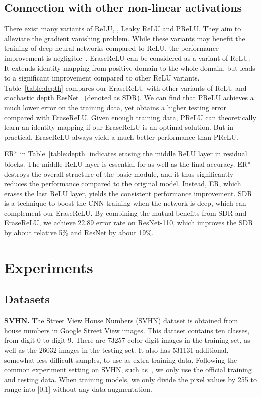 \documentclass[10pt,twocolumn,letterpaper]{article}
\begin{document}
\subsection{Connection with other non-linear activations}\label{sec:connection}
There exist many variants of ReLU, \eg, Leaky ReLU and PReLU. They aim to alleviate the gradient vanishing problem. 
While these variants may benefit the training of deep neural networks compared to ReLU, the performance improvement is negligible~\cite{xu2015empirical}.
EraseReLU can be considered as a variant of ReLU. It extends identity mapping from positive domain to the whole domain, but leads to a significant improvement compared to other ReLU variants.
Table~\ref{table:depth} compares our EraseReLU with other variants of ReLU and stochastic depth ResNet~\cite{huang2016deep} (denoted as SDR).
We can find that PReLU achieves a much lower error on the training data, yet obtains a higher testing error compared with EraseReLU.
Given enough training data, PReLU can theoretically learn an identity mapping if our EraseReLU is an optimal solution.
But in practical, EraseReLU always yield a much better performance than PReLU.

ER* in Table~\ref{table:depth} indicates erasing the middle ReLU layer in residual blocks.
The middle ReLU layer is essential for as well as the final accuracy.
ER* destroys the overall structure of the basic module, and it thus significantly reduces the performance compared to the original model.
Instead, ER, which erases the last ReLU layer, yields the consistent performance improvement.
SDR is a technique to boost the CNN training when the network is deep, which can complement our EraseReLU.
By combining the mutual benefits from SDR and EraseReLU, we achieve 22.89 error rate on ResNet-110, which improves the SDR by about relative 5\% and ResNet by about 19\%.


\section{Experiments}



\subsection{Datasets}

\textbf{SVHN.} 
The Street View House Numbers (SVHN) dataset is obtained from house numbers in Google Street View images. This dataset contains ten classes, from digit 0 to digit 9.
There are 73257 color digit images in the training set, as well as the 26032 images in the testing set. It also has 531131 additional, somewhat less difficult samples, to use as extra training data.
Following the common experiment setting on SVHN, such as~\cite{zagoruyko2016wide,huang2017densely}, we only use the official training and testing data. When training models, we only divide the pixel values by 255 to range into [0,1] without any data augmentation.
\end{document}

